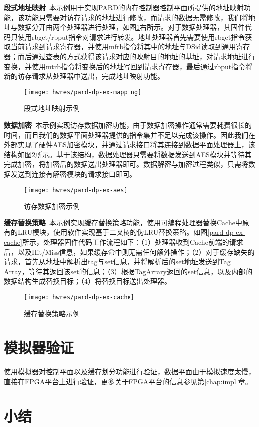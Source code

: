 \textbf{段式地址映射}\ 本示例用于实现PARD的内存控制器控制平面所提供的地址映射功能，该功能只需要对访存请求的地址进行修改，而请求的数据无需修改，我们将地址与数据分开由两个处理器进行处理，如图\ref{fig:pard-dp-ex-mapping}右所示。对于数据处理器，其固件代码只使用rbget/rbput指令对请求进行转发。地址处理器首先需要使用rbget指令获取当前请求到请求寄存器，并使用mfrb指令将其中的地址与DSid读取到通用寄存器；而后通过查表的方式获得该请求对应的映射目的地址的基址，对请求地址进行变换，并使用mtrb指令将变换后的地址写回到请求寄存器，最后通过rbput指令将新的访存请求从处理器中送出，完成地址映射功能。

\begin{figure}[H]
  \centering
  \texttt{[image: hwres/pard-dp-ex-mapping]}
  \caption{段式地址映射示例}
  \label{fig:pard-dp-ex-mapping}
\end{figure}
 
\textbf{数据加密}\ 本示例实现访存数据加密功能，由于数据加密操作通常需要耗费很长的时间，而且我们的数据平面处理器提供的指令集并不足以完成该操作。因此我们在外部实现了硬件AES加密模块，并通过请求接口将其连接到数据平面处理器上，该结构如图\ref{fig:pard-dp-ex-aes}所示。基于该结构，数据处理器只需要将数据发送到AES模块并等待其完成加密，将加密后的数据送出处理器即可。数据解密与加密过程类似，只需将数据发送到连接有解密模块的请求接口即可。

\begin{figure}[H]
  \centering
  \texttt{[image: hwres/pard-dp-ex-aes]}
  \caption{访存数据加密示例}
  \label{fig:pard-dp-ex-aes}
\end{figure}
 
\textbf{缓存替换策略}\ 本示例实现缓存替换策略功能，使用可编程处理器替换Cache中原有的LRU模块，使用软件实现基于二叉树的伪LRU替换策略。如图\ref{pard-dp-ex-cache}所示，处理器固件代码工作流程如下：（1）处理器收到Cache前端的请求后，以及Hit/Miss信息，如果缓存命中则无需任何额外操作；（2）对于缓存缺失的请求，首先从地址中解析出tag与set信息，并将解析后的set地址发送到Tag Array，等待其返回该set的信息；（3）根据TagArrary返回的set信息，以及内部的数据结构生成替换目标；（4）将替换目标送出处理器。

\begin{figure}[H]
  \centering
  \texttt{[image: hwres/pard-dp-ex-cache]}
  \caption{缓存替换策略示例}
  \label{fig:pard-dp-ex-cache}
\end{figure}


\section{模拟器验证}

使用模拟器对控制平面以及缓存划分功能进行验证，数据平面由于模拟速度太慢，直接在FPGA平台上进行验证，更多关于FPGA平台的信息参见第\ref{chap:impl}章。


\section{小结}

